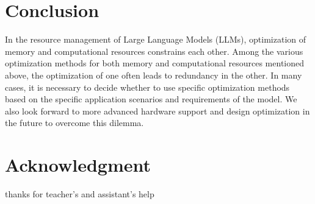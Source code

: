 \documentclass[conference]{IEEEtran}
\begin{document}
\section{Conclusion}
In the resource management of Large Language Models (LLMs), optimization of memory and computational resources constrains each other. Among the various optimization methods for both memory and computational resources mentioned above, the optimization of one often leads to redundancy in the other. In many cases, it is necessary to decide whether to use specific optimization methods based on the specific application scenarios and requirements of the model. We also look forward to more advanced hardware support and design optimization in the future to overcome this dilemma.

\section{Acknowledgment}
thanks for teacher's and assistant's help
\end{document}
